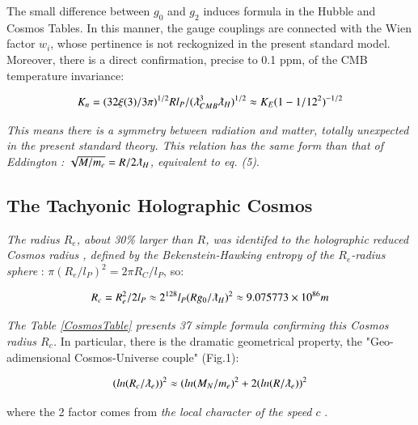 \documentclass[a4paper,9pt]{article}
\begin{document}
The small difference between $g_0$ and $g_2$ induces formula in the Hubble and Cosmos Tables. In this manner, the gauge couplings are connected with the  Wien factor $w_i$, whose pertinence is not reckognized in the present standard model. Moreover, there is a direct confirmation, precise to 0.1 ppm, of the CMB temperature invariance:

\begin{equation}\label{Eq6}
K_n = (32 \xi(3) /3\pi)^{1/2} R l_P/(\lambdabar_{CMB}^3 \lambdabar_H)^{1/2} \approx K_E (1-1/12^2)^{-1/2} 
 \end{equation}

\textit{This means there is a symmetry between radiation and matter, totally unexpected in the present standard theory. This relation has the same form than that of Eddington : $\sqrt{M/m_e} = R/2\lambdabar_H$, equivalent to eq. (5)}.

\subsection{The Tachyonic Holographic Cosmos}

\textit {The radius $R_e$, about 30\% larger than $R$, was identifed to the holographic reduced Cosmos radius \cite{Sanchez3}, defined by the Bekenstein-Hawking entropy of the $R_e$-radius sphere} \cite{Bekenstein}: $\pi (R_e/l_P)^2 = 2\pi R_C/l_P$, so:   

 \begin{equation}\label{Eq6}
R_c = R_e^2/2l_P \approx 2^{128} l_P (Rg_0/ \lambdabar_H)^2 \approx 9.075773 \times 10^{86} m 
 \end{equation}
 
 \textit{The Table \ref{CosmosTable} presents 37 simple formula confirming this Cosmos radius $R_c$.} In particular, there is the dramatic geometrical property, the "Geo-adimensional Cosmos-Universe couple" (Fig.1): 

\begin{equation}\label{Eq7}
(ln(R_c/\lambdabar_e))^2 \approx (ln(M_N/m_e)^2 + 2(ln(R/\lambdabar_e))^2
\end{equation}

where the 2 factor comes from \textit{the local character of the speed $c$} \cite{Sanchez2}. 
\end{document}
